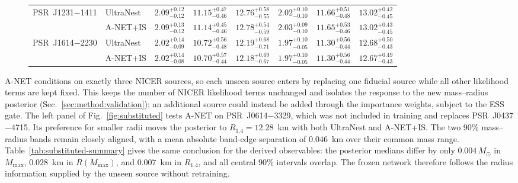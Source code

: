 \documentclass[aps,prd,twocolumn,superscriptaddress,nofootinbib,longbibliography]{revtex4-2}
\newenvironment{resultfigurewide}{\begin{figure}[tp]\centering}{\end{figure}}
\begin{document}
\begin{resultfigurewide}
\begin{minipage}{0.98\textwidth}
\begin{tabular}{@{}llcccccc@{}}
      PSR~J1231$-$1411 & UltraNest
        & $2.09^{+0.12}_{-0.12}$ & $11.15^{+0.47}_{-0.46}$ & $12.76^{+0.58}_{-0.55}$
        & $2.02^{+0.10}_{-0.10}$ & $11.66^{+0.51}_{-0.48}$ & $13.02^{+0.42}_{-0.45}$ \\
       & A-NET+IS
        & $2.09^{+0.13}_{-0.12}$ & $11.14^{+0.45}_{-0.46}$ & $12.78^{+0.54}_{-0.59}$
        & $2.03^{+0.09}_{-0.10}$ & $11.65^{+0.53}_{-0.46}$ & $13.02^{+0.43}_{-0.45}$ \\
      \addlinespace[2pt]
      PSR~J1614$-$2230 & UltraNest
        & $2.02^{+0.14}_{-0.09}$ & $10.72^{+0.56}_{-0.48}$ & $12.19^{+0.68}_{-0.71}$
        & $1.97^{+0.10}_{-0.05}$ & $11.30^{+0.56}_{-0.44}$ & $12.68^{+0.50}_{-0.43}$ \\
       & A-NET+IS
        & $2.02^{+0.14}_{-0.08}$ & $10.70^{+0.57}_{-0.44}$ & $12.18^{+0.69}_{-0.67}$
        & $1.97^{+0.10}_{-0.05}$ & $11.30^{+0.56}_{-0.44}$ & $12.67^{+0.49}_{-0.43}$ \\
      \bottomrule
    \end{tabular}
  \end{minipage}
\end{resultfigurewide}

A-NET conditions on exactly three NICER sources, so each
unseen source enters by replacing one fiducial source while all other
likelihood terms are kept fixed. This keeps the number of NICER likelihood
terms unchanged and isolates the response to the new mass--radius posterior
(Sec.~\ref{sec:method:validation}); an additional source could instead be
added through the importance weights, subject to the ESS gate. The left panel
of Fig.~\ref{fig:substituted} tests A-NET on PSR~J0614$-$3329,
which was not included in training and replaces
PSR~J0437$-$4715. Its preference for
smaller radii moves the posterior to $R_{1.4}=12.28$~km with both UltraNest and
A-NET+IS. The two 90\% mass--radius bands remain closely aligned, with a mean
absolute band-edge separation of $0.046$~km over their common mass range.
Table~\ref{tab:substituted-summary} gives the same conclusion for the derived
observables: the posterior medians differ by only $0.004\,M_\odot$ in
$M_{\max}$, $0.028$~km in $R(M_{\max})$, and $0.007$~km in $R_{1.4}$, and all
central 90\% intervals overlap. The frozen network therefore follows the
radius information supplied by the unseen source without retraining.
\end{document}
